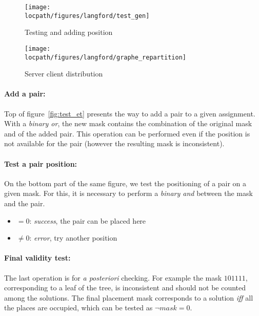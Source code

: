 \begin{figure}[t!]
\begin{minipage}[b]{0.5\linewidth}
\centering
\texttt{[image: \\locpath/figures/langford/test\_gen]}
\caption{Testing and adding position} \label{fig:test_et}
\end{minipage}
\begin{minipage}[b]{0.5\linewidth}
\centering 
\texttt{[image: \\locpath/figures/langford/graphe\_repartition]}   
\caption{Server client distribution} \label{fig:parallel} 

\end{minipage}
\end{figure}

\paragraph{Add a pair: }
Top of figure~\ref{fig:test_et} presents the way to add a pair to a given assignment.
With a \emph{binary or}, the new mask contains the combination of the original mask and of the added pair.
This operation can be performed even if the position is not available for the pair (however the resulting mask is inconsistent). 

\paragraph{Test a pair position: }
On the bottom part of the same figure, we test the positioning of a pair on a given mask. 
For this, it is necessary to perform a \emph{binary and} between the mask and the pair.
\begin{itemize}
	\item[] $=0$: \emph{success}, the pair can be placed here
	\item[] $\neq0$: \emph{error}, try another position
\end{itemize}

\paragraph{Final validity test: }
The last operation is for \emph{a posteriori} checking. For example the mask $101111$, corresponding to a leaf of the tree, is inconsistent and should not be counted among the solutions.
The final placement mask corresponds to a solution \emph{iff} all the places are occupied, which can be tested as $\neg mask = 0$. %
\\

